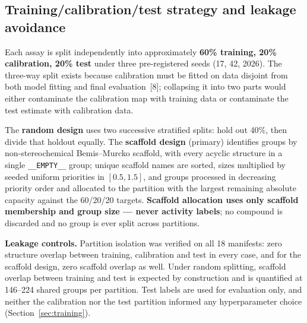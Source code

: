 \documentclass[10pt,letterpaper]{article}
\begin{document}
\subsection{Training/calibration/test strategy and leakage avoidance}

Each assay is split independently into approximately \textbf{60\% training, 20\% calibration, 20\%
test} under three pre-registered seeds (17, 42, 2026). The three-way split exists because
calibration must be fitted on data disjoint from both model fitting and final evaluation~[8];
collapsing it into two parts would either contaminate the calibration map with training data or
contaminate the test estimate with calibration data.

The \textbf{random design} uses two successive stratified splits: hold out 40\%, then divide that
holdout equally. The \textbf{scaffold design} (primary) identifies groups by non-stereochemical
Bemis--Murcko scaffold, with every acyclic structure in a single \texttt{\_\_EMPTY\_\_} group; unique
scaffold names are sorted, sizes multiplied by seeded uniform priorities in $[0.5,1.5]$, and groups
processed in decreasing priority order and allocated to the partition with the largest remaining
absolute capacity against the 60/20/20 targets. \textbf{Scaffold allocation uses only scaffold
membership and group size --- never activity labels}; no compound is discarded and no group is ever
split across partitions.

\textbf{Leakage controls.} Partition isolation was verified on all 18 manifests: zero structure
overlap between training, calibration and test in every case, and for the scaffold design, zero
scaffold overlap as well. Under random splitting, scaffold overlap between training and test is
expected by construction and is quantified at 146--224 shared groups per partition. Test labels are
used for evaluation only, and neither the calibration nor the test partition informed any
hyperparameter choice (Section~\ref{sec:training}).
\end{document}
